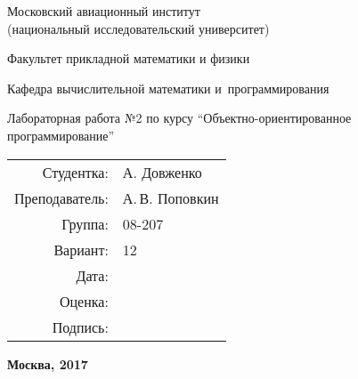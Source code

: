 \begin{titlepage}
\begin{center}
\bfseries

{\Large Московский авиационный институт\\ (национальный исследовательский университет)

}

\vspace{48pt}

{\large Факультет прикладной математики и физики

}

\vspace{36pt}


{\large Кафедра вычислительной математики и~программирования

}


\vspace{48pt}

Лабораторная работа №2 по курсу \enquote{Объектно-ориентированное программирование}

\end{center}

\vspace{72pt}

\begin{flushright}
\begin{tabular}{rl}
Студентка: & А. Довженко \\
Преподаватель: & А.\,В. Поповкин \\
Группа: & 08-207 \\
Вариант: & 12 \\
Дата: & \\
Оценка: & \\
Подпись: & \\
\end{tabular}
\end{flushright}

\vfill

\begin{center}
\bfseries
Москва, 2017
\end{center}
\end{titlepage}

\pagebreak